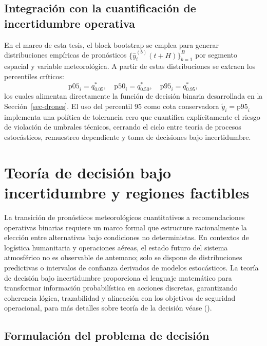 \documentclass[
  spanish,
  us-letterpaper,
]{scrreprt}
\numberwithin{equation}{section}
\begin{document}
\subsection{Integración con la cuantificación de incertidumbre
operativa}\label{integraciuxf3n-con-la-cuantificaciuxf3n-de-incertidumbre-operativa}

En el marco de esta tesis, el block bootstrap se emplea para generar
distribuciones empíricas de pronósticos
\(\{\hat{y}_i^{(b)}(t+H)\}_{b=1}^B\) por segmento espacial y variable
meteorológica. A partir de estas distribuciones se extraen los
percentiles críticos: \[
\text{p05}_i = q_{0.05}^*, \quad \text{p50}_i = q_{0.50}^*, \quad \text{p95}_i = q_{0.95}^*,
\] los cuales alimentan directamente la función de decisión binaria
desarrollada en la Sección~\ref{sec-drones}. El uso del percentil 95
como cota conservadora \(\tilde{y}_i = \text{p95}_i\) implementa una
política de tolerancia cero que cuantifica explícitamente el riesgo de
violación de umbrales técnicos, cerrando el ciclo entre teoría de
procesos estocásticos, remuestreo dependiente y toma de decisiones bajo
incertidumbre.

\section{Teoría de decisión bajo incertidumbre y regiones
factibles}\label{teoruxeda-de-decisiuxf3n-bajo-incertidumbre-y-regiones-factibles}

La transición de pronósticos meteorológicos cuantitativos a
recomendaciones operativas binarias requiere un marco formal que
estructure racionalmente la elección entre alternativas bajo condiciones
no deterministas. En contextos de logística humanitaria y operaciones
aéreas, el estado futuro del sistema atmosférico no es observable de
antemano; solo se dispone de distribuciones predictivas o intervalos de
confianza derivados de modelos estocásticos. La teoría de decisión bajo
incertidumbre proporciona el lenguaje matemático para transformar
información probabilística en acciones discretas, garantizando
coherencia lógica, trazabilidad y alineación con los objetivos de
seguridad operacional, para más detalles sobre teoría de la decisión
véase ().

\subsection{Formulación del problema de
decisión}\label{formulaciuxf3n-del-problema-de-decisiuxf3n}
\end{document}
